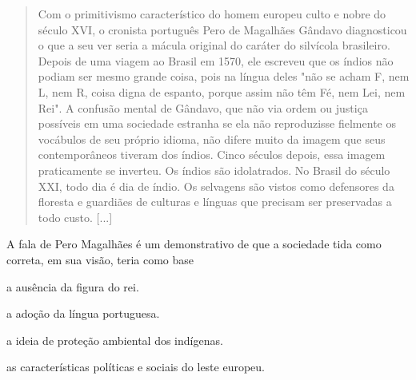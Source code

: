 \begin{quote}
Com o primitivismo característico do homem europeu culto e
nobre do século XVI, o cronista português Pero de Magalhães Gândavo
diagnosticou o que a seu ver seria a mácula original do caráter do
silvícola brasileiro. Depois de uma viagem ao Brasil em 1570, ele
escreveu que os índios não podiam ser mesmo grande coisa, pois na língua
deles "não se acham F, nem L, nem R, coisa digna de espanto, porque
assim não têm Fé, nem Lei, nem Rei". A confusão mental de Gândavo, que
não via ordem ou justiça possíveis em uma sociedade estranha se ela não
reproduzisse fielmente os vocábulos de seu próprio idioma, não difere
muito da imagem que seus contemporâneos tiveram dos índios. Cinco
séculos depois, essa imagem praticamente se inverteu. Os índios são
idolatrados. No Brasil do século XXI, todo dia é dia de índio. Os
selvagens são vistos como defensores da floresta e guardiães de culturas
e línguas que precisam ser preservadas a todo custo. {[}...{]}

\end{quote}

A fala de Pero Magalhães é um demonstrativo de que a sociedade tida como
correta, em sua visão, teria como base

\begin{escolha}
\item
  a ausência da figura do rei.
\item
  a adoção da língua portuguesa.
\item
  a ideia de proteção ambiental dos indígenas.
\item
  as características políticas e sociais do leste europeu.
\end{escolha}



